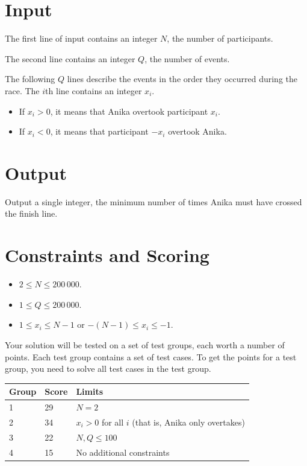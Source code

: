 \section*{Input}
The first line of input contains an integer $N$, the number of participants.

The second line contains an integer $Q$, the number of events.

The following $Q$ lines describe the events in the order they occurred during the race.
The $i$th line contains an integer $x_i$.
\begin{itemize}
\item If $x_i > 0$, it means that Anika overtook participant $x_i$.
\item If $x_i < 0$, it means that participant $-x_i$ overtook Anika.
\end{itemize}

\section*{Output}
Output a single integer, the minimum number of times Anika must have crossed the finish line.

\section*{Constraints and Scoring}
\begin{itemize}
\item $2 \le N \le 200\,000$.
\item $1 \le Q \le 200\,000$.
\item $1 \le x_i \le N-1$ or $-(N-1) \le x_i \le -1$.
\end{itemize}


Your solution will be tested on a set of test groups, each worth a number of points.
Each test group contains a set of test cases. To get the points for a test group, you need to solve all test cases in the test group.



\begin{tabular}{|l|l|l|}
\hline
Group  &  Score  &  Limits \\
\hline
 1 & 29 & $N = 2$   \\
\hline
 2 & 34 & $x_{i} > 0$ for all $i$ (that is, Anika only overtakes) \\
\hline
 3 & 22 & $N,Q\leq 100$  \\
\hline
 4 & 15 & No additional constraints \\
\hline
\end{tabular}
